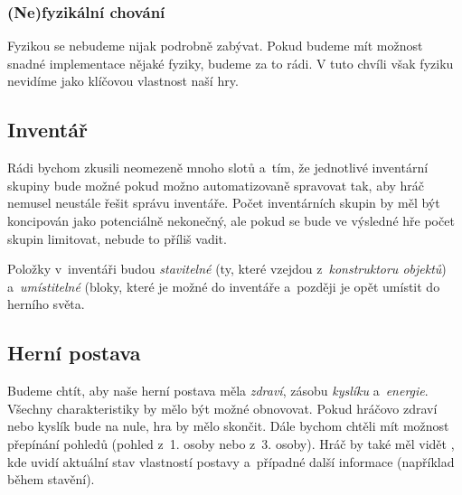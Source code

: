 \subsubsection{(Ne)fyzikální chování}

Fyzikou se nebudeme nijak podrobně zabývat. Pokud budeme mít možnost snadné implementace nějaké fyziky, budeme za to rádi. V tuto chvíli však fyziku nevidíme jako klíčovou vlastnost naší hry. 

\subsection{Inventář}

Rádi bychom zkusili neomezeně mnoho slotů a~tím, že jednotlivé inventární skupiny bude možné pokud možno automatizovaně spravovat tak, aby hráč nemusel neustále řešit správu inventáře. Počet inventárních skupin by měl být koncipován jako potenciálně nekonečný, ale pokud se bude ve výsledné hře počet skupin limitovat, nebude to příliš vadit.

Položky v~inventáři budou \textit{stavitelné} (ty, které vzejdou z~\textit{konstruktoru objektů}) a~\textit{umístitelné} (bloky, které je možné  do inventáře a~později je opět umístit do herního světa.

\subsection{Herní postava}
\label{subsec:postava}
Budeme chtít, aby naše herní postava měla \textit{zdraví}, zásobu \textit{kyslíku} a~\textit{energie}. Všechny charakteristiky by mělo být možné obnovovat. Pokud hráčovo zdraví nebo kyslík bude na nule, hra by mělo skončit. Dále bychom chtěli mít možnost přepínání pohledů (pohled z~1. osoby nebo z~3. osoby). Hráč by také měl vidět \HUD{}, kde uvidí aktuální stav vlastností postavy a~případné další informace (například během stavění).



